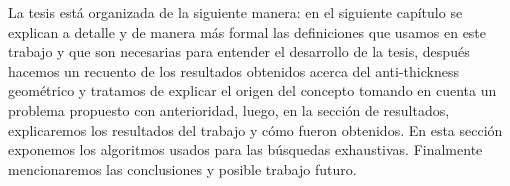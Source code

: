 La tesis está organizada de la siguiente manera: en el siguiente capítulo se explican
 a detalle y de manera más formal las definiciones que usamos en este trabajo y que
son necesarias para entender el desarrollo de la tesis, después hacemos un recuento de los resultados
obtenidos acerca del anti-thickness geométrico y tratamos de explicar el origen del concepto tomando en cuenta
un problema propuesto con anterioridad, luego, en la sección de resultados, explicaremos los resultados del trabajo y cómo fueron
obtenidos. En esta sección exponemos los algoritmos usados para las búsquedas exhaustivas. Finalmente
mencionaremos las conclusiones y posible trabajo futuro.

